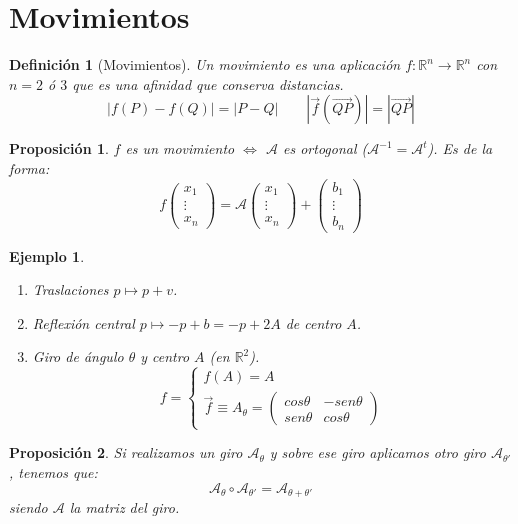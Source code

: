 \documentclass[11pt, a4paper]{article}
\newif\IfInSansMode
\newcommand{\R}{\mathbb{R}}
\renewcommand{\vec}{\overrightarrow}
\theoremstyle{theorem-style}
\newtheorem{nprop}{Proposición}[section]
\theoremstyle{definition-style}
\newtheorem{ndef}{Definición}[section]
\theoremstyle{remark-style}
\theoremstyle{example-style}
\newtheorem{ejemplo}{Ejemplo}[section]
\newenvironment{nlist}
{\begin{enumerate}
    \renewcommand\labelenumi{(\emph{\roman{enumi})}}}
  {\end{enumerate}}
\begin{document}
\section{Movimientos}

\begin{ndef}[Movimientos]
  Un movimiento es una aplicación $f:\R^n \to \R^n$ con $n= 2$ ó $3$ que es una afinidad que conserva distancias.
  \[
    |f(P)-f(Q)|= |P-Q| \quad  \quad |\vec{f}(\vec{QP})|= |\vec{QP}|
  \]
\end{ndef}

\begin{nprop}
  $f$ es un movimiento $\iff$ $\mathcal A$ es ortogonal ($\mathcal A ^{-1}= \mathcal A ^t$). Es de la forma:
  \[
    f \begin{pmatrix}
      x_1\\
      \vdots\\
      x_n 
    \end{pmatrix} = \mathcal A \begin{pmatrix}
      x_1\\
      \vdots\\
      x_n 
    \end{pmatrix} + \begin{pmatrix}
      b_1\\
      \vdots\\
      b_n 
    \end{pmatrix}
  \]
\end{nprop}


\begin{ejemplo}\hfill
  \begin{nlist}
  \item Traslaciones $p \mapsto p+v$.
  \item Reflexión central $p \mapsto -p +b= -p +2A$ de centro $A$.
  \item Giro de ángulo $\theta$ y centro $A$ (en $\R^2$).
    \[
      f= \begin{cases}
	f(A) = A \\
	\vec{f} \equiv A_{\theta} = \begin{pmatrix}
          cos \theta & -sen \theta\\
          sen \theta & cos \theta
        \end{pmatrix} 
      \end{cases}
    \]
  \end{nlist}
\end{ejemplo}

\begin{nprop}
  Si realizamos un giro $\mathcal A_\theta$ y sobre ese giro aplicamos otro giro $\mathcal A_{\theta'}$, tenemos que:
  \[
    \mathcal A_{\theta} \circ \mathcal A_{\theta'} = \mathcal A_{\theta+\theta'}
  \]
  siendo $\mathcal A$ la matriz del giro.
\end{nprop}
\end{document}
